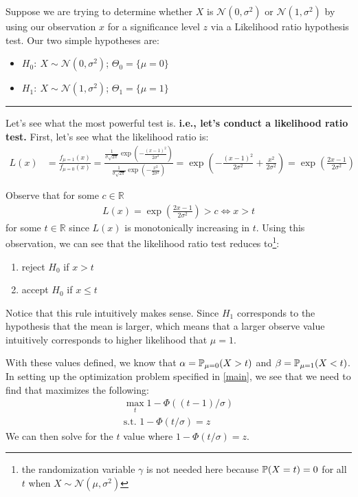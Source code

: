 \documentclass{article}
\begin{document}
\newpage
\begin{example}
 Suppose we are trying to determine whether $X$ is $\mathcal{N}(0,\sigma^2)$ or $\mathcal{N}(1,\sigma^2)$ by using our observation $x$ for a significance level $z$ via a Likelihood ratio hypothesis test. Our two simple hypotheses are: 
\begin{itemize}
    \item $H_0:\ X \sim \mathcal{N}(0, \sigma^2)$; $\Theta_0 = \{\mu = 0\}$
    \item $H_1:\ X \sim \mathcal{N}(1, \sigma^2)$; $\Theta_1 = \{\mu = 1\}$
\end{itemize}
\noindent\rule{4cm}{0.4pt}

Let's see what the most powerful test is. \textbf{i.e., let's conduct a likelihood ratio test.} First, let's see what the likelihood ratio is:
\begin{align*}
L(x) &=  \frac{f_{\mu=1}(x)}{f_{\mu=0}(x)} = \frac{\frac{1}{\sigma\sqrt{2\pi}} \exp\left( -\frac{(x-1)^2}{2\sigma^2} \right)}{\frac{1}{\sigma\sqrt{2\pi}} \exp\left(- \frac{x^2}{2\sigma^2} \right)}
=\exp\left( -\frac{(x-1)^2}{2\sigma^2} + \frac{x^2}{2\sigma^2}\right)
= \exp\left( \frac{2x -1}{2\sigma^2}\right)
\end{align*}

Observe that for some $c \in \mathbb{R}$
\begin{align*}
L(x) = \exp\left( \frac{2x -1}{2\sigma^2}\right) > c \iff  x > t
\end{align*}
for some $t \in \mathbb{R}$ since $L(x)$ is monotonically increasing in $t$. Using this observation, we can see that the likelihood ratio test reduces to\footnote{the randomization variable $\gamma$ is not needed here because $\operatorname{\mathbb{P}}(X = t) = 0$ for all $t$ when $X \sim \mathcal{N}(\mu, \sigma^2)$}:
\begin{enumerate}
    \item reject $H_0$ if $x > t$
    \item accept $H_0$ if $x \leq t$
\end{enumerate}
Notice that this rule intuitively makes sense. Since $H_1$ corresponds to the hypothesis that the mean is larger, which means that a larger observe value intuitively corresponds to higher likelihood that $\mu=1$.

With these values defined, we know that $\alpha = \operatorname{\mathbb{P}}_{\mu=0}(X > t)$ and $\beta = \operatorname{\mathbb{P}}_{\mu=1}(X < t)$. In setting up the optimization problem specified in \eqref{main}, we see that we need to find that maximizes the following:
\begin{gather*}
\max_t 1 - \Phi\left( (t-1) / \sigma \right)\\
\text{s.t. } 1 - \Phi\left( t / \sigma \right) = z
\end{gather*}
We can then solve for the $t$ value where $1 - \Phi\left( t / \sigma \right) = z$.
\end{example}
\end{document}
